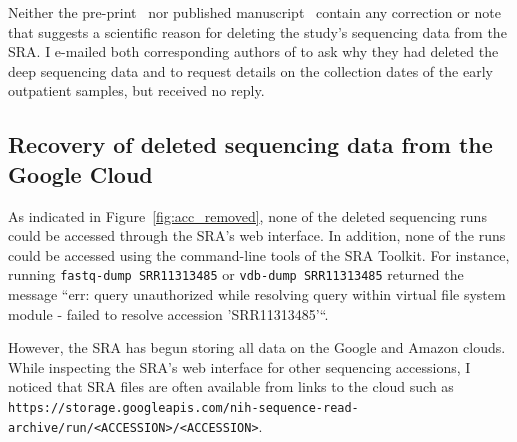\documentclass[9pt,twocolumn,twoside]{gsajnl_modified}
\begin{document}
Neither the pre-print~\citep{wang2020medRxiv} nor published manuscript~\citep{wang2020small} contain any correction or note that suggests a scientific reason for deleting the study's sequencing data from the SRA.
I e-mailed both corresponding authors of \citet{wang2020medRxiv} to ask why they had deleted the deep sequencing data and to request details on the collection dates of the early outpatient samples, but received no reply.

\subsection{Recovery of deleted sequencing data from the Google Cloud} 
As indicated in Figure~\ref{fig:acc_removed}, none of the deleted sequencing runs could be accessed through the SRA's web interface.
In addition, none of the runs could be accessed using the command-line tools of the SRA Toolkit.
For instance, running \texttt{fastq-dump SRR11313485} or \texttt{vdb-dump SRR11313485} returned the message ``err: query unauthorized while resolving query within virtual file system module - failed to resolve accession 'SRR11313485'``.

However, the SRA has begun storing all data on the Google and Amazon clouds.
While inspecting the SRA's web interface for other sequencing accessions, I noticed that SRA files are often available from links to the cloud such as \texttt{https://storage.googleapis.com/nih-sequence-read-archive/run/<ACCESSION>/<ACCESSION>}.
\end{document}
